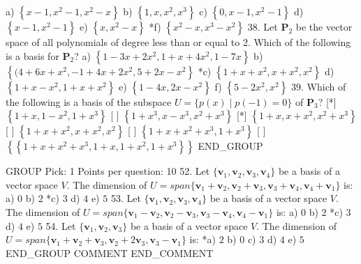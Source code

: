 a)  $\left\{x-1,x^{2}-1,x^{2}-x\right\}$
b)  $\left\{1,x,x^{2},x^{3}\right\}$
c)  $\left\{0,x-1,x^{2}-1\right\}$
d)  $\left\{x-1,x^{2}-1\right\}$
e)  $\left\{x,x^{2}-x\right\}$
*f) $\left\{x^{2}-x,x^{3}-x^{2}\right\}$
38. Let $\mathbf{P}_{2}$ be the vector space of all polynomials of degree less than or equal to $2$. Which of the following is a basis for $\mathbf{P}_{2}$? %
a)  $\left\{1-3x+2x^{2},1+x+4x^{2},1-7x\right\}$
b)  $\left\{(4+6x+x^{2},-1+4x+2x^{2},5+2x-x^{2}\right\}$
*c) $\left\{1+x+x^{2},x+x^{2},x^{2}\right\}$
d)  $\left\{1+x-x^{2},1+x+x^{2}\right\}$
e)  $\left\{1-4x,2x-x^{2}\right\}$
f)  $\left\{5-2x^{2},x^{2}\right\}$
39. Which of the following is a basis of the subspace $U=\{p(x)\mid p(-1)=0\}$ of $\mathbf{P}_{3}$? %
[*] $\left\{1+x,1-x^{2},1+x^{3}\right\}$
[ ] $\left\{1+x^{3},x-x^{3},x^{2}+x^{3}\right\}$
[*] $\left\{1+x,x+x^{2},x^{2}+x^{3}\right\}$
[ ] $\left\{1+x+x^{2},x+x^{2},x^{2}\right\}$
[ ] $\left\{1+x+x^{2}+x^{3},1+x^{3}\right\}$
[ ] $\left\{\left\{ 1+x+x^{2}+x^{3},1+x,1+x^{2},1+x^{3}\right\}  \right\}$
END_GROUP

GROUP
Pick: 1
Points per question: 10
52. Let $\{\mathbf{v}_{1},\mathbf{v}_{2},\mathbf{v}_{3},\mathbf{v}_{4}\}$ %
    be a basis of a vector space $V$. The dimension of $U=span\{\mathbf{v}
    _{1}+\mathbf{v}_{2},\mathbf{v}_{2}+\mathbf{v}_{3},\mathbf{v}_{3}
    +\mathbf{v}_{4},\mathbf{v}_{4}+\mathbf{v}_{1}\}$ is:
a)  $0$
b)  $2$
*c) $3$
d)  $4$
e)  $5$
53. Let $\{\mathbf{v}_{1},\mathbf{v}_{2},\mathbf{v}_{3},\mathbf{v}_{4}\}$ %
    be a basis of a vector space $V$. The dimension of $U=span\{\mathbf{v}
    _{1}-\mathbf{v}_{2},\mathbf{v}_{2}-\mathbf{v}_{3},\mathbf{v}_{3}
    -\mathbf{v}_{4},\mathbf{v}_{4}-\mathbf{v}_{1}\}$ is:
a)  $0$
b)  $2$
*c) $3$
d)  $4$
e)  $5$
54. Let $\{\mathbf{v}_{1},\mathbf{v}_{2},\mathbf{v}_{3}\}$ be a basis of a %
    vector space $V$. The dimension of $U=span\{\mathbf{v}_{1}+\mathbf{v}
    _{2}+\mathbf{v}_{3},\mathbf{v}_{2}+2\mathbf{v}_{3},\mathbf{v}_{3}
    -\mathbf{v}_{1}\}$ is:
*a) $2$
b)  $0$
c)  $3$
d)  $4$
e)  $5$
END_GROUP
COMMENT
END_COMMENT
